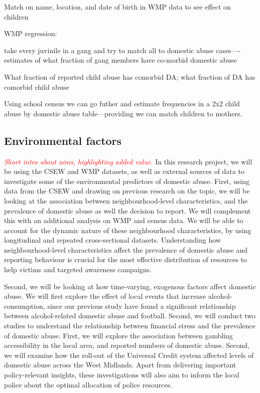 \documentclass[11pt, a4paper]{article}
\begin{document}
Match on name, location, and date of birth in WMP data to see effect on children

WMP regression:

take every juvinile in a gang and try to match all to domestic abuse cases----estimates of what fraction of gang members have co-morbid domestic abuse

What fraction of reported child abuse has comorbid DA; what fraction of DA has comorbid child abuse

Using school census we can go futher and estimate frequencies in a 2x2 child abuse  by domestic abuse table---providing we can match children to mothers.



\newpage

\subsection*{Environmental factors}

\textcolor{red}{\textit{Short intro about aims, highlighting added value.}}
In this research project, we will be using the CSEW and WMP datasets, as well as external sources of data to investigate some of the environmental predictors of domestic abuse. First, using data from the CSEW and drawing on previous research on the topic, we will be looking at the association between neighbourhood-level characteristics, and the prevalence of domestic abuse as well the decision to report. We will complement this with an additional analysis on WMP and census data. We will be able to account for the dynamic nature of these neighbourhood characteristics, by using longitudinal and repeated cross-sectional datasets. Understanding how neighbourhood-level characteristics affect the prevalence of domestic abuse and reporting behaviour is crucial for the most effective distribution of resources to help victims and targeted awareness campaigns. 

Second, we will be looking at how time-varying, exogenous factors affect domestic abuse. We will first explore the effect of local events that increase alcohol-consumption, since our previous study have found a significant relationship between alcohol-related domestic abuse and football. Second, we will conduct two studies to understand the relationship between financial stress and the prevalence of domestic abuse. First, we will explore the association between gambling accessibility in the local area, and reported numbers of domestic abuse. Second, we will examine how the roll-out of the Universal Credit system affected levels of domestic abuse across the West Midlands. Apart from delivering important policy-relevant insights, these investigations will also aim to inform the local police about the optimal allocation of police resources. 
\end{document}
